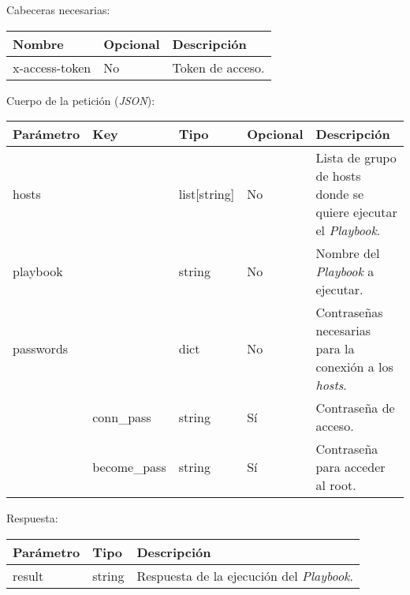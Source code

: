 		Cabeceras necesarias:
		\begin{table}[h!]
			\centering
	\begin{adjustbox}{max width=\textwidth}
			\begin{tabular}{|l|l|l|}
				\hline
				Nombre & Opcional & Descripción \\ \hline
				x-access-token & No & Token de acceso. \\ \hline
			\end{tabular}
\end{adjustbox}
		\end{table}
		
		Cuerpo de la petición (\textit{JSON}):
		\begin{table}[h!]
			\centering
	\begin{adjustbox}{max width=\textwidth}
			\begin{tabularx}{\linewidth}{|l|l|l|l|L|}
				\hline
				Parámetro & Key & Tipo & Opcional & Descripción \\ \hline
				hosts &  & list[string] & No & Lista de grupo de hosts donde se quiere ejecutar el \textit{Playbook}. \\ \hline
				playbook &  & string & No & Nombre del \textit{Playbook} a ejecutar. \\ \hline
				passwords &  & dict & No & Contraseñas necesarias para la conexión a los \textit{hosts}. \\ \hline
				& conn\_pass & string & Sí & Contraseña de acceso. \\ \hline
				& become\_pass & string & Sí & Contraseña para acceder al root. \\ \hline
			\end{tabularx}
\end{adjustbox}
		\end{table}
		
		\pagebreak
		Respuesta:
		\begin{table}[h!]
			\centering
	\begin{adjustbox}{max width=\textwidth}
			\begin{tabular}{|l|l|l|}
				\hline
				Parámetro & Tipo & Descripción \\ \hline
				result & string & Respuesta de la ejecución del \textit{Playbook}. \\ \hline
			\end{tabular}
\end{adjustbox}
		\end{table}








